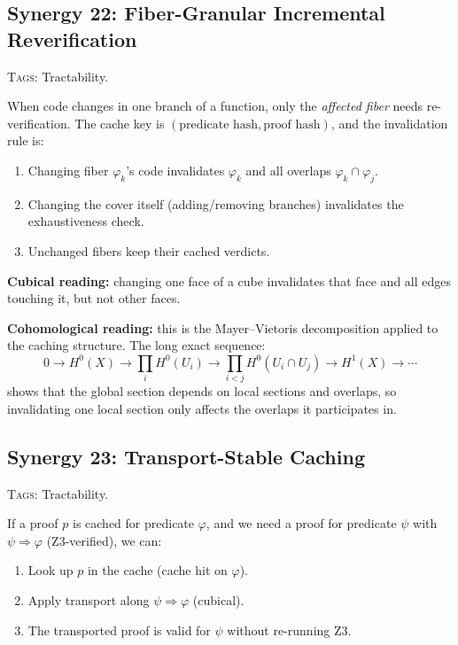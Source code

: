\documentclass[11pt,a4paper]{article}
\theoremstyle{definition}
\theoremstyle{plain}
\newcommand{\Hzero}{H^0}
\newcommand{\Hone}{H^1}
\begin{document}
\subsection{Synergy 22: Fiber-Granular Incremental Reverification}
\label{sec:syn-incremental-fiber}

\textsc{Tags:} Tractability.

\medskip\noindent
When code changes in one branch of a function, only the
\emph{affected fiber} needs re-verification.  The cache key is
$(\text{predicate hash}, \text{proof hash})$, and the invalidation
rule is:

\begin{enumerate}
\item Changing fiber $\varphi_k$'s code invalidates $\varphi_k$ and
  all overlaps $\varphi_k \cap \varphi_j$.
\item Changing the cover itself (adding/removing branches)
  invalidates the exhaustiveness check.
\item Unchanged fibers keep their cached verdicts.
\end{enumerate}

\textbf{Cubical reading:} changing one face of a cube invalidates
that face and all edges touching it, but not other faces.

\textbf{Cohomological reading:} this is the Mayer--Vietoris
decomposition applied to the caching structure.  The long exact
sequence:
\[
  0 \to \Hzero(X) \to \prod_i \Hzero(U_i) \to \prod_{i<j}
  \Hzero(U_i \cap U_j) \to \Hone(X) \to \cdots
\]
shows that the global section depends on local sections and
overlaps, so invalidating one local section only affects the
overlaps it participates in.


\subsection{Synergy 23: Transport-Stable Caching}
\label{sec:syn-transport-cache}

\textsc{Tags:} Tractability.

\medskip\noindent
If a proof $p$ is cached for predicate $\varphi$, and we need a
proof for predicate $\psi$ with $\psi \Rightarrow \varphi$
(Z3-verified), we can:
\begin{enumerate}
\item Look up $p$ in the cache (cache hit on $\varphi$).
\item Apply transport along $\psi \Rightarrow \varphi$ (cubical).
\item The transported proof is valid for $\psi$ without re-running Z3.
\end{enumerate}
\end{document}
